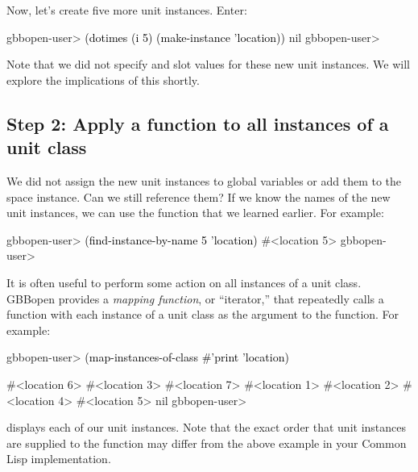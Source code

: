 \documentclass[10pt,twoside,english,pdftex]{article}
\begin{document}
Now, let's create five more  unit instances.  Enter:
%
%
%
\W\supp
\begin{example}
\textcolor{darkergray}{%
  gbbopen-user> \textcolor{black}{(dotimes (i 5) (make-instance 'location))}
  nil
  gbbopen-user>}
\end{example}
%
Note that we did not specify  and  slot values for these new
unit instances.  We will explore the implications of this shortly.

\subsection*{Step 2: Apply a function to all instances of a unit class}

%
%
%
%
%
We did not assign the new  unit instances to global
variables or add them to the  space instance.  Can we
still reference them?  If we know the names of the new unit instances, we can
use the  function that we learned
earlier.  For example:
%
\W\supp
\begin{example}
\textcolor{darkergray}{%
  gbbopen-user> \textcolor{black}{(find-instance-by-name 5 'location)}
  #<location 5>
  gbbopen-user>}
\end{example}

%
%
%
It is often useful to perform some action on all instances of a unit class.
GBBopen provides a \textit{mapping function}, or ``iterator,'' that repeatedly
calls a function with each instance of a unit class as the argument to the
function.  For example:
%
\W\supp
\begin{example}
\textcolor{darkergray}{%
  gbbopen-user> \textcolor{black}{(map-instances-of-class #'print 'location)}

  #<location 6> 
  #<location 3> 
  #<location 7> 
  #<location 1> 
  #<location 2> 
  #<location 4> 
  #<location 5> 
  nil
  gbbopen-user>}
\end{example}
%
displays each of our  unit instances.  Note that the
exact order that  unit instances are supplied to the
 function may differ from the above example in your Common Lisp
implementation.
\end{document}
